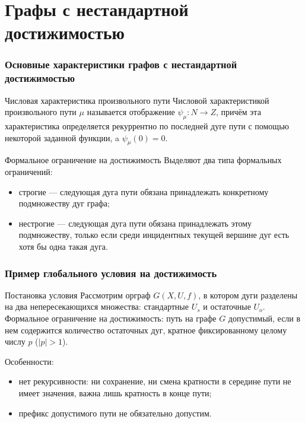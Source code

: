 \documentclass{beamer}
\begin{document}
\section{Графы с нестандартной достижимостью}

\begin{frame}
\frametitle{Основные характеристики графов с нестандартной достижимостью}

	\begin{block}{Числовая характеристика произвольного пути}
		Числовой характеристикой произвольного пути $\mu$ называется отображение $\psi_\mu:N\to Z$, причём эта характеристика определяется рекуррентно по последней дуге пути с помощью некоторой заданной функции, a $\psi_\mu(0) = 0$.
	\end{block}
	
	\begin{block}{Формальное ограничение на достижимость}
		Выделяют два типа формальных ограничений:
		\begin{itemize}
			\item строгие --- следующая дуга пути обязана принадлежать конкретному подмножеству дуг графа;
			\item нестрогие --- следующая дуга пути обязана принадлежать этому подмножеству, только если среди инцидентных текущей вершине дуг есть хотя бы одна такая дуга.
		\end{itemize}
	
	\end{block}
\end{frame}


\begin{frame}
\frametitle{Пример глобального условия на достижимость}

	\begin{block}{Постановка условия}
		Рассмотрим орграф $G(X,U,f)$, в котором дуги разделены на два непересекающихся множества: стандартные $U_s$ и остаточные $U_o$. Формальное ограничение на достижимость: путь на графе $G$ допустимый, если в нем содержится количество остаточных дуг, кратное фиксированному целому числу $p$ ($|p| > 1$). 
	\end{block}

	Особенности:
	\begin{itemize}
		\item нет рекурсивности: ни сохранение, ни смена кратности в середине пути не имеет значения, важна лишь кратность в конце пути;
		\item префикс допустимого пути не обязательно допустим.
	\end{itemize}

\end{frame}
\end{document}
